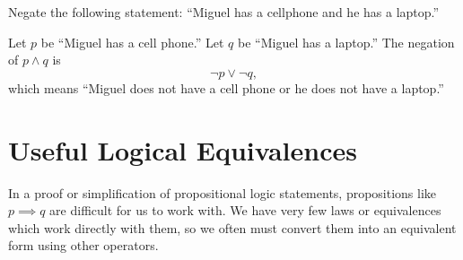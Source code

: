 \begin{defn}
\begin{ex}
  Negate the following statement:
  ``Miguel has a cellphone and he has a laptop.''
  \begin{sol}
    Let \(p\) be ``Miguel has a cell phone.''
    Let \(q\) be ``Miguel has a laptop.''
    The negation of $p \land q$ is
    \[ \neg p \lor \neg q, \]
    which means ``Miguel does not have a cell phone or he does not have a laptop.''
  \end{sol}
\end{ex}

\section{Useful Logical Equivalences}

In a proof or simplification of propositional logic statements, propositions like $p \implies q$
are difficult for us to work with.
We have very few laws or equivalences which work directly with them, so we often must convert them into an equivalent form using other operators.


\end{defn}
